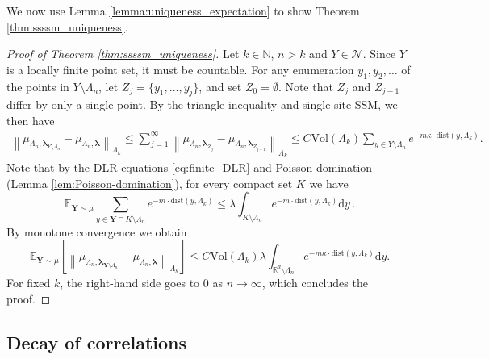 \documentclass[10pt]{amsart}
\theoremstyle{definition}
\theoremstyle{remark}
\newcommand{\pointsets}{\mathcal{N}}
\newcommand{\bY}{\mathbf{Y}}
\newcommand{\dist}{\mathrm{dist}}
\newcommand{\E}{\mathbb{E}}
\newcommand{\N}{\mathbb{N}}
\newcommand{\R}{\mathbb{R}}
\newcommand{\region}{\Lambda}
\newcommand{\activities}{\pmb{\lambda}}
\newcommand{\diff}{\mathrm{d}}
\newcommand{\vol}{\mathrm{Vol}}
\begin{document}
	We now use Lemma \ref{lemma:uniqueness_expectation} to show Theorem \ref{thm:ssssm_uniqueness}.
	\begin{proof}[Proof of Theorem \ref{thm:ssssm_uniqueness}]
		Let $k \in \N$, $n > k$ and $Y \in \pointsets$.
		Since $Y$ is a locally finite point set, it must be countable.
		For any enumeration $y_1, y_2, \dots$ of the points in $Y \setminus \region_n$, let $Z_j = \{y_1, \dots, y_j\}$, and set $Z_0 = \emptyset$.
		Note that $Z_j$ and $Z_{j-1}$ differ by only a single point.
		By the triangle inequality and single-site SSM, we then have
		\begin{align*}
			\left\|\mu_{\region_n, \activities_{Y \setminus \region_n}} - \mu_{\region_n, \activities}\right\|_{\region_k} 
			\le \sum_{j = 1}^{\infty}  \left\|{\mu_{\region_n, \activities_{Z_{j}}} - \mu_{\region_n, \activities_{Z_{j-1}}}}\right\|_{\region_k}  \le C  \vol(\region_k) \sum_{y \in Y \setminus \region_n} e^{- m \kappa\cdot\dist(y, \region_k)}.
		\end{align*}
		Note that by the DLR equations \eqref{eq:finite_DLR} and Poisson domination (Lemma \ref{lem:Poisson-domination}), for every compact set $K$ we have $$\E_{\bY \sim \mu} \sum_{y \in \bY \cap K \setminus \Lambda_n} e^{-m\cdot\dist(y,\Lambda_k)} \leq \lambda \int_{K \setminus \Lambda_n} e^{-m \cdot\dist(y,\Lambda_k)} \diff y\,.$$
		By monotone convergence we obtain    
		\begin{equation} \label{eq:infinite-volume-to-finite}
			\E_{\bY \sim \mu}\left[\left\|{\mu_{\region_n, \activities_{\bY \setminus \region_n}} - \mu_{\region_n, \activities}}\right\|_{\region_k}\right] 
			\le C \vol(\region_k)   \lambda \int_{\R^d \setminus \region_n} e^{- m \kappa\cdot\dist(y, \region_k)} \diff y.
		\end{equation}
		For fixed $k$, the right-hand side goes to $0$ as $n \to \infty$, which concludes the proof.  
	\end{proof}
	
	
	\subsection{Decay of correlations}
	
\end{document}
